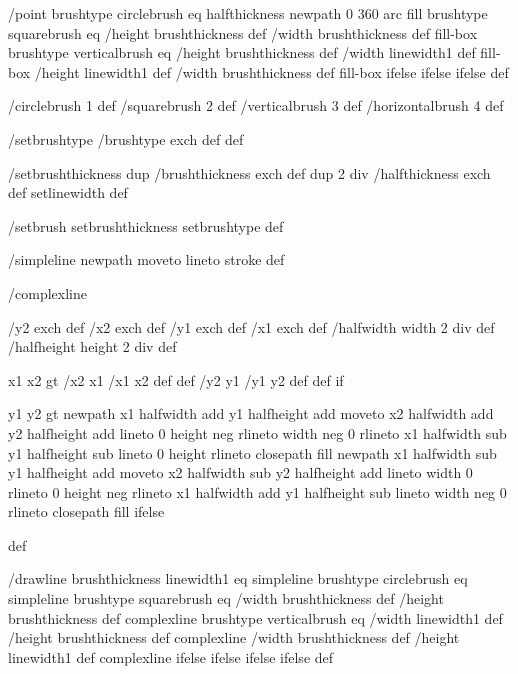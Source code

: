 /point
  { brushtype circlebrush eq
     { halfthickness newpath 0 360 arc fill }
     { brushtype squarebrush eq
        { /height brushthickness def
	  /width brushthickness def
	  fill-box }
        { brushtype verticalbrush eq
           { /height brushthickness def
	     /width linewidth1 def
	     fill-box }
           { /height linewidth1 def
	     /width brushthickness def
	     fill-box }
	   ifelse }
        ifelse }
     ifelse } def

/circlebrush     1 def
/squarebrush     2 def
/verticalbrush   3 def
/horizontalbrush 4 def

/setbrushtype { /brushtype exch def } def

/setbrushthickness
  { dup /brushthickness exch def
    dup 2 div /halfthickness exch def
    setlinewidth } def

/setbrush { setbrushthickness setbrushtype } def

/simpleline { newpath moveto lineto stroke } def

/complexline
  { /y2 exch def /x2 exch def
    /y1 exch def /x1 exch def
    /halfwidth width 2 div def
    /halfheight height 2 div def

    x1 x2 gt { /x2 x1 /x1 x2 def def /y2 y1 /y1 y2 def def } if

    y1 y2 gt
     { %
       newpath
        x1 halfwidth add y1 halfheight add moveto
	x2 halfwidth add y2 halfheight add lineto
	0 height neg rlineto
        width neg 0 rlineto
        x1 halfwidth sub y1 halfheight sub lineto
        0 height rlineto
        closepath
	fill }
     { %
       newpath
        x1 halfwidth sub y1 halfheight add moveto
	x2 halfwidth sub y2 halfheight add lineto
	width 0 rlineto
	0 height neg rlineto
	x1 halfwidth add y1 halfheight sub lineto
	width neg 0 rlineto
	closepath
	fill }
     ifelse } def

/drawline
  { brushthickness linewidth1 eq
    { simpleline }
    { brushtype circlebrush eq
       { %
         simpleline }
       { brushtype squarebrush eq
          { %
            /width brushthickness def
	    /height brushthickness def
	    complexline }
          { brushtype verticalbrush eq
             { %
	       /width linewidth1 def
	       /height brushthickness def
	       complexline }
             { %
	       /width brushthickness def
	       /height linewidth1 def
	       complexline }
             ifelse }
          ifelse }
       ifelse }
    ifelse } def

